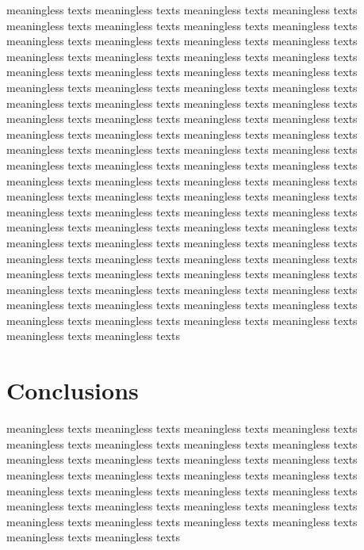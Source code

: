 \documentclass[12pt, twoside, notitlepage, twocolumn]{article}
\begin{document}
        meaningless texts meaningless texts meaningless texts meaningless texts meaningless texts 
        meaningless texts meaningless texts meaningless texts meaningless texts meaningless texts 
        meaningless texts meaningless texts meaningless texts meaningless texts meaningless texts 
        meaningless texts meaningless texts meaningless texts meaningless texts meaningless texts 
        meaningless texts meaningless texts meaningless texts meaningless texts meaningless texts 
        meaningless texts meaningless texts meaningless texts meaningless texts meaningless texts 
        meaningless texts meaningless texts meaningless texts meaningless texts meaningless texts 
        meaningless texts meaningless texts meaningless texts meaningless texts meaningless texts 
        meaningless texts meaningless texts meaningless texts meaningless texts meaningless texts 
        meaningless texts meaningless texts meaningless texts meaningless texts meaningless texts 
        meaningless texts meaningless texts meaningless texts meaningless texts meaningless texts 
        meaningless texts meaningless texts 
        meaningless texts meaningless texts meaningless texts 
        meaningless texts meaningless texts meaningless texts meaningless texts meaningless texts 
        meaningless texts meaningless texts meaningless texts meaningless texts meaningless texts 
        meaningless texts meaningless texts meaningless texts meaningless texts meaningless texts 
        meaningless texts meaningless texts meaningless texts meaningless texts meaningless texts 
        meaningless texts meaningless texts meaningless texts meaningless texts meaningless texts 
        meaningless texts 
        
        \section{Conclusions}
        meaningless texts meaningless texts meaningless texts meaningless texts meaningless texts 
        meaningless texts meaningless texts meaningless texts meaningless texts meaningless texts 
        meaningless texts meaningless texts meaningless texts meaningless texts meaningless texts 
        meaningless texts meaningless texts meaningless texts meaningless texts meaningless texts 
        meaningless texts meaningless texts meaningless texts meaningless texts meaningless texts 
        meaningless texts meaningless texts meaningless texts meaningless texts meaningless texts 
\end{document}
